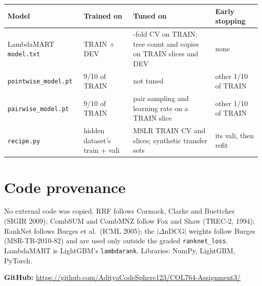\documentclass[10pt,a4paper]{article}
\begin{document}
\begin{center}
\normalsize\renewcommand{\arraystretch}{1.45}
\begin{tabularx}{\textwidth}{@{}ll>{\raggedright\arraybackslash}Xl@{}}
\toprule
Model & Trained on & Tuned on & Early stopping\\
\midrule
LambdaMART \texttt{model.txt} & TRAIN + DEV & 5-fold CV on TRAIN; tree count and copies on TRAIN slices and DEV & none\\
\texttt{pointwise\_model.pt} & 9/10 of TRAIN & not tuned & other 1/10 of TRAIN\\
\texttt{pairwise\_model.pt} & 9/10 of TRAIN & pair sampling and learning rate on a TRAIN slice & other 1/10 of TRAIN\\
\texttt{recipe.py} & hidden dataset's train + vali & MSLR TRAIN CV and slices; synthetic transfer sets & its vali, then refit\\
\bottomrule
\end{tabularx}
\end{center}

\section{Code provenance}
No external code was copied. RRF follows Cormack, Clarke and Buettcher (SIGIR 2009); CombSUM and CombMNZ follow Fox and Shaw (TREC-2, 1994); RankNet follows Burges et al.\ (ICML 2005); the $|\Delta\mathrm{nDCG}|$ weights follow Burges (MSR-TR-2010-82) and are used only outside the graded \texttt{ranknet\_loss}. LambdaMART is LightGBM's \texttt{lambdarank}. Libraries: NumPy, LightGBM, PyTorch.

\textbf{GitHub:} \url{https://github.com/AdityaCodeSphere123/COL764-Assignment3/}
\end{document}
